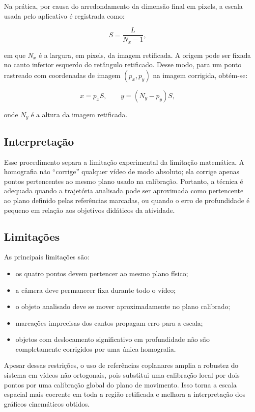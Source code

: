 Na prática, por causa do arredondamento da dimensão final em pixels, a escala usada pelo aplicativo é registrada como:

\[
    S = \frac{L}{N_x-1},
\]

em que $N_x$ é a largura, em pixels, da imagem retificada. A origem pode ser fixada no canto inferior esquerdo do retângulo retificado. Desse modo, para um ponto rastreado com coordenadas de imagem $(p_x,p_y)$ na imagem corrigida, obtém-se:

\[
    x = p_x S,
    \qquad
    y = (N_y-p_y)S,
\]

onde $N_y$ é a altura da imagem retificada.

\subsection{Interpretação}

Esse procedimento separa a limitação experimental da limitação matemática. A homografia não ``corrige'' qualquer vídeo de modo absoluto; ela corrige apenas pontos pertencentes ao mesmo plano usado na calibração. Portanto, a técnica é adequada quando a trajetória analisada pode ser aproximada como pertencente ao plano definido pelas referências marcadas, ou quando o erro de profundidade é pequeno em relação aos objetivos didáticos da atividade.

\subsection{Limitações}

As principais limitações são:

\begin{itemize}
    \item os quatro pontos devem pertencer ao mesmo plano físico;
    \item a câmera deve permanecer fixa durante todo o vídeo;
    \item o objeto analisado deve se mover aproximadamente no plano calibrado;
    \item marcações imprecisas dos cantos propagam erro para a escala;
    \item objetos com deslocamento significativo em profundidade não são completamente corrigidos por uma única homografia.
\end{itemize}

Apesar dessas restrições, o uso de referências coplanares amplia a robustez do sistema em vídeos não ortogonais, pois substitui uma calibração local por dois pontos por uma calibração global do plano de movimento. Isso torna a escala espacial mais coerente em toda a região retificada e melhora a interpretação dos gráficos cinemáticos obtidos.
